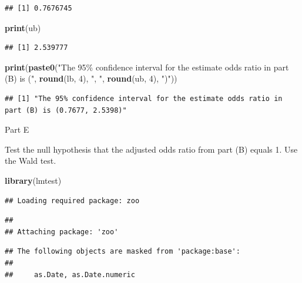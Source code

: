\documentclass[
]{article}
\newenvironment{Shaded}{\begin{snugshade}}{\end{snugshade}}
\newcommand{\DecValTok}[1]{\textcolor[rgb]{0.00,0.00,0.81}{#1}}
\newcommand{\FunctionTok}[1]{\textcolor[rgb]{0.13,0.29,0.53}{\textbf{#1}}}
\newcommand{\NormalTok}[1]{#1}
\newcommand{\StringTok}[1]{\textcolor[rgb]{0.31,0.60,0.02}{#1}}
\begin{document}
\begin{verbatim}
## [1] 0.7676745
\end{verbatim}

\begin{Shaded}
\begin{Highlighting}[]
\FunctionTok{print}\NormalTok{(ub)}
\end{Highlighting}
\end{Shaded}

\begin{verbatim}
## [1] 2.539777
\end{verbatim}

\begin{Shaded}
\begin{Highlighting}[]
\FunctionTok{print}\NormalTok{(}\FunctionTok{paste0}\NormalTok{(}\StringTok{"The 95\% confidence interval for the estimate odds ratio in part (B) is ("}\NormalTok{, }\FunctionTok{round}\NormalTok{(lb, }\DecValTok{4}\NormalTok{), }\StringTok{", "}\NormalTok{, }\FunctionTok{round}\NormalTok{(ub, }\DecValTok{4}\NormalTok{), }\StringTok{")"}\NormalTok{))}
\end{Highlighting}
\end{Shaded}

\begin{verbatim}
## [1] "The 95% confidence interval for the estimate odds ratio in part (B) is (0.7677, 2.5398)"
\end{verbatim}

Part E

Test the null hypothesis that the adjusted odds ratio from part (B)
equals 1. Use the Wald test.

\begin{Shaded}
\begin{Highlighting}[]
\FunctionTok{library}\NormalTok{(lmtest)}
\end{Highlighting}
\end{Shaded}

\begin{verbatim}
## Loading required package: zoo
\end{verbatim}

\begin{verbatim}
## 
## Attaching package: 'zoo'
\end{verbatim}

\begin{verbatim}
## The following objects are masked from 'package:base':
## 
##     as.Date, as.Date.numeric
\end{verbatim}
\end{document}
